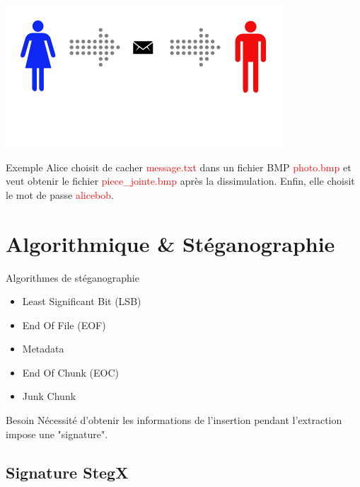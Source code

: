 \documentclass{beamer}
\begin{document}
  \begin{frame} %
	\hspace{1.7cm}
    \includegraphics[scale=0.5]{pictures/alice_bob.png}
	
	\begin{exampleblock}{Exemple} 
	Alice choisit de cacher \textcolor{red}{message.txt} dans un fichier 
	BMP \textcolor{red}{photo.bmp} et veut obtenir le fichier 
	\textcolor{red}{piece\_jointe.bmp} après la 
	dissimulation. Enfin, elle choisit le mot de passe \textcolor{red}{alicebob}. 
	\end{exampleblock}
  \end{frame}
  
  \section{Algorithmique \& Stéganographie}
    \begin{frame} %
	\begin{block}{Algorithmes de stéganographie}
	\begin{itemize}
	[circle]
	\item Least Significant Bit (LSB)
	\item End Of File (EOF)
	\item Metadata
	\item End Of Chunk (EOC)
	\item Junk Chunk 
	\end{itemize}
	\end{block}
	
	\begin{alertblock}{Besoin} 
	Nécessité d'obtenir les informations de l'insertion pendant l'extraction
	impose une "signature".
	\end{alertblock}

  \end{frame}
  
  \subsection{Signature StegX}
  
\end{document}
